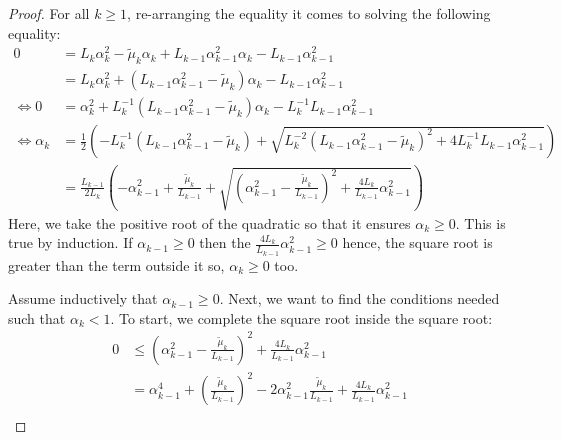 \documentclass[12pt]{article}
\begin{document}
    \begin{proof}
        For all $k \ge 1$, re-arranging the equality it comes to solving the following equality: 
        \begin{align*}
            0 &= L_k\alpha_k^2 - \tilde\mu_k\alpha_k + L_{k - 1}\alpha_{k - 1}^2\alpha_k - L_{k - 1}\alpha_{k - 1}^2
            \\
            &= L_k\alpha_k^2 + (L_{k - 1}\alpha_{k - 1}^2 - \tilde \mu_k)\alpha_k - L_{k - 1}\alpha_{k - 1}^2
            \\
            \iff 0 &=
            \alpha_k^2 + L_k^{-1}(L_{k - 1}\alpha_{k - 1}^2 - \tilde \mu_k)\alpha_k - L_k^{-1}L_{k - 1}\alpha_{k - 1}^2
            \\
            \iff 
            \alpha_k &= 
            \frac{1}{2}\left(
                -L^{-1}_k(L_{k - 1} \alpha_{k - 1}^2 - \tilde\mu_k)
                + \sqrt{
                    L_k^{-2}(L_{k - 1}\alpha_{k - 1}^2 - \tilde \mu_k)^2
                    + 4L_k^{-1}L_{k - 1} \alpha_{k - 1}^2
                }
            \right)
            \\
            &= \frac{L_{k-1}}{2L_k}\left(
                - \alpha_{k - 1}^2 + \frac{\tilde \mu_k}{L_{k - 1}}
                + \sqrt{
                    \left(
                        \alpha_{k - 1}^2 - \frac{\tilde \mu_k}{L_{k - 1}}
                    \right)^2 + \frac{4L_k}{L_{k - 1}}\alpha_{k - 1}^2
                }
            \right)
        \end{align*}
        Here, we take the positive root of the quadratic so that it ensures $\alpha_k \ge 0$. 
        This is true by induction. 
        If $\alpha_{k - 1} \ge 0$ then the $\frac{4L_k}{L_{k - 1}}\alpha_{k - 1}^2 \ge 0$ hence, the square root is greater than the term outside it so, $\alpha_k \ge 0$ too. 
        \par
        Assume inductively that $\alpha_{k - 1} \ge 0$. 
        Next, we want to find the conditions needed such that $\alpha_k < 1$. 
        To start, we complete the square root inside the square root: 
        \begin{align*}
            0&\le 
            \left(
                \alpha_{k - 1}^2 - \frac{\tilde \mu_k}{L_{k - 1}}
            \right)^2 + \frac{4L_k}{L_{k - 1}}\alpha_{k - 1}^2
            \\
            &= \alpha_{k - 1}^4 + \left(\frac{\tilde \mu_k}{L_{k - 1}}\right)^2
            - 2\alpha_{k - 1}^2 \frac{\tilde \mu_k}{L_{k - 1}} 
            + \frac{4L_k}{L_{k - 1}}\alpha_{k - 1}^2
            \\

\end{align*}
\end{proof}
\end{document}
